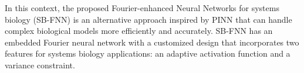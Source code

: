 


In this context, the proposed Fourier-enhanced Neural Networks for systems biology (SB-FNN) is an alternative approach inspired by PINN that can handle complex biological models more efficiently and accurately. SB-FNN has an embedded Fourier neural network with a customized design that incorporates two features for systems biology applications: an adaptive activation function and a variance constraint.

